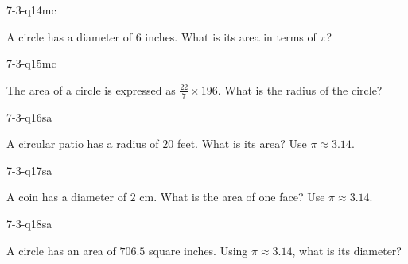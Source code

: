 \begin{practiceQuestion}{7-3-q14}{mc}
\begin{questionText}
A circle has a diameter of $6$ inches. What is its area in terms of $\pi$?
\end{questionText}
\end{practiceQuestion}

\begin{practiceQuestion}{7-3-q15}{mc}
\begin{questionText}
The area of a circle is expressed as $\frac{22}{7} \times 196$. What is the radius of the circle?
\end{questionText}
\end{practiceQuestion}


\begin{practiceQuestion}{7-3-q16}{sa}
\begin{questionText}
A circular patio has a radius of $20$ feet. What is its area? Use $\pi \approx 3.14$.
\end{questionText}
\end{practiceQuestion}

\begin{practiceQuestion}{7-3-q17}{sa}
\begin{questionText}
A coin has a diameter of $2$ cm. What is the area of one face? Use $\pi \approx 3.14$.
\end{questionText}
\end{practiceQuestion}

\begin{practiceQuestion}{7-3-q18}{sa}
\begin{questionText}
A circle has an area of $706.5$ square inches. Using $\pi \approx 3.14$, what is its diameter?
\end{questionText}
\end{practiceQuestion}

